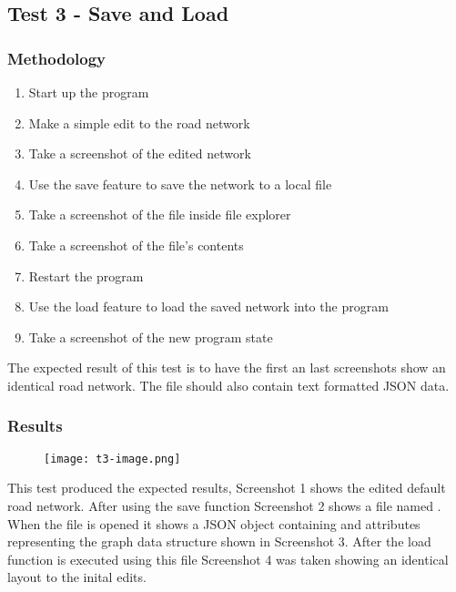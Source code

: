     \subsection{Test 3 - Save and Load}
    \label{testing:t3}

        \subsubsection{Methodology}

            \begin{enumerate}
                \item Start up the program
                \item Make a simple edit to the road network
                \item Take a screenshot of the edited network
                \item Use the save feature to save the network to a local file
                \item Take a screenshot of the file inside file explorer
                \item Take a screenshot of the file's contents
                \item Restart the program
                \item Use the load feature to load the saved network into the program
                \item Take a screenshot of the new program state
            \end{enumerate}

            The expected result of this test is to have the first an last screenshots show an identical road network. The file should also contain text formatted JSON data.

            \subsubsection{Results}

                \begin{figure}[ht]
                    \centering
                    \texttt{[image: t3-image.png]}
                    \caption{}
                    \label{testing:t3-image}
                \end{figure}

                This test produced the expected results, Screenshot 1 shows the edited default road network. After using the save function Screenshot 2 shows a  file named . When the file is opened it shows a JSON object containing  and  attributes representing the graph data structure shown in Screenshot 3. After the load function is executed using this file Screenshot 4 was taken showing an identical layout to the inital edits.


